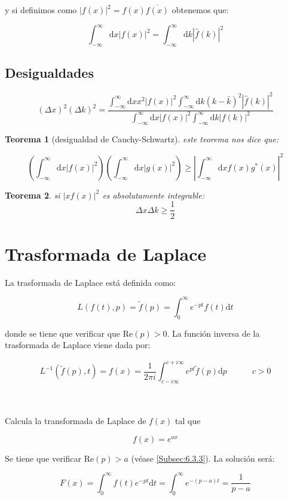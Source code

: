 \documentclass[12pt]{book}
\newcommand{\parentesis}[1]{\left( #1  \right)}
\newcommand{\D}{\mathrm{d}}
\newcommand{\Real}{\mathrm{Re}}
\newcommand{\inti}{\int_{-\infty}^{\infty}}
\newcommand{\into}{\int_{0}^{\infty}}
\newcommand{\hatf}{\widehat{f}}
\newcommand{\tf}{\tilde{f}}
\newcommand{\tquad}{\quad  \quad \quad}
\newtheorem{theorem}{Teorema}[section]
\begin{document}
y si definimos como $| f(x)| ^2 = f(x) \overline{f(x)}$ obtenemos que:

\begin{equation}
\inti \D x |f(x)|^2 = \inti \D k |\widehat{f}(k)|^2 
\end{equation}


\subsection{Desigualdades}

\begin{equation}
(\Delta x)^2(\Delta k)^2 = \dfrac{\inti \D x x^2 |f(x)|^2 \inti \D k (k - \bar{k})^2 |\hatf(k)|^2}{\inti \D x |f(x)|^2 \inti \D k |f(k)|^2}
\end{equation}


\begin{theorem}[desigualdad de Cauchy-Schwartz]
este teorema nos dice que:

$$ \parentesis{\inti \D x |f(x)|^2} \parentesis{\inti \D x |g(x)|^2} \geq \left| \inti \D x f(x) g^* (x) \right|^2   $$
\end{theorem}

\begin{theorem}
si $|xf(x)|^2$ es absolutamente integrable:
$$ \Delta x \Delta k \geq \frac{1}{2} $$
\end{theorem}



\section{Trasformada de Laplace}

La trasformada de Laplace está definida como:

\begin{equation}
L(f(t),p) = \tf (p) = \int_0^\infty e^{-pt} f(t) \D t
\end{equation}

donde se tiene que verificar que $\Real (p) > 0$. La función inversa de la trasformada de Laplace viene dada por:

\begin{equation}
L^{-1} (\tf(p),t) = f(x) = \dfrac{1}{2 \pi i} \int_{c- i \infty}^{c+i\infty} e^{pt} \tf (p) \D p \tquad c > 0 
\end{equation} \\


\begin{flushleft}

\hrulefill \\

Calcula la transformada de Laplace de $f(x)$ tal que

$$ f(x) = e^{ax}   $$

Se tiene que verificar $\Real(p)>a$ (véase \ref{Subsec:6.3.3}). La solución será:

$$ F(x) =  \into f(t) e^{-pt} \D t = \into e^{-(p-a)t} = \dfrac{1}{p-a}  $$
\hrulefill \\


\end{flushleft}
\end{document}
